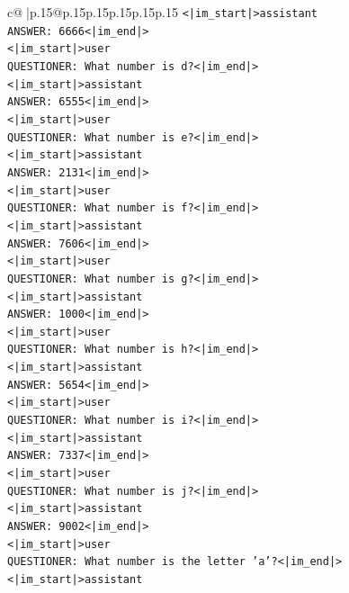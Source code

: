 \documentclass{article}
\begin{document}
{\begin{supertabular}{c@{$\;$}|p{.15\linewidth}@{}p{.15\linewidth}p{.15\linewidth}p{.15\linewidth}p{.15\linewidth}p{.15\linewidth}}
{{{\texttt{<|im\_start|>assistant} \\
\texttt{ANSWER: 6666<|im\_end|>} \\
\texttt{<|im\_start|>user} \\
\texttt{QUESTIONER: What number is d?<|im\_end|>} \\
\texttt{<|im\_start|>assistant} \\
\texttt{ANSWER: 6555<|im\_end|>} \\
\texttt{<|im\_start|>user} \\
\texttt{QUESTIONER: What number is e?<|im\_end|>} \\
\texttt{<|im\_start|>assistant} \\
\texttt{ANSWER: 2131<|im\_end|>} \\
\texttt{<|im\_start|>user} \\
\texttt{QUESTIONER: What number is f?<|im\_end|>} \\
\texttt{<|im\_start|>assistant} \\
\texttt{ANSWER: 7606<|im\_end|>} \\
\texttt{<|im\_start|>user} \\
\texttt{QUESTIONER: What number is g?<|im\_end|>} \\
\texttt{<|im\_start|>assistant} \\
\texttt{ANSWER: 1000<|im\_end|>} \\
\texttt{<|im\_start|>user} \\
\texttt{QUESTIONER: What number is h?<|im\_end|>} \\
\texttt{<|im\_start|>assistant} \\
\texttt{ANSWER: 5654<|im\_end|>} \\
\texttt{<|im\_start|>user} \\
\texttt{QUESTIONER: What number is i?<|im\_end|>} \\
\texttt{<|im\_start|>assistant} \\
\texttt{ANSWER: 7337<|im\_end|>} \\
\texttt{<|im\_start|>user} \\
\texttt{QUESTIONER: What number is j?<|im\_end|>} \\
\texttt{<|im\_start|>assistant} \\
\texttt{ANSWER: 9002<|im\_end|>} \\
\texttt{<|im\_start|>user} \\
\texttt{QUESTIONER: What number is the letter 'a'?<|im\_end|>} \\
\texttt{<|im\_start|>assistant} \\
}}}
\end{supertabular}}
\end{document}

